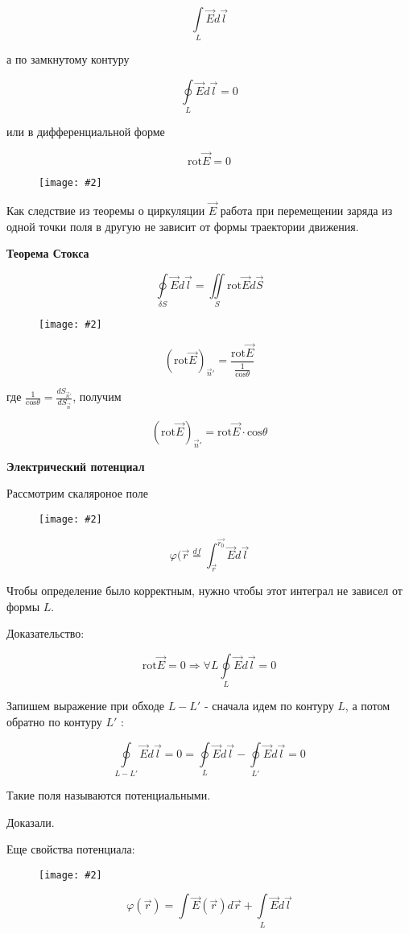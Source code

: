 \documentclass[a4paper,12pt]{article}
\newcommand{\tc}[1]{
    \vspace{0.5em}
    \noindent\textbf{\large #1}
    \vspace{0.3em}
}
\newcommand{\fc}[1]{\[#1\]}
\newcommand{\mdd}[1]{$#1$}
\newcommand{\mm}[1]{\mathrm{#1}}
\newcommand{\imc}[2][0.7\textwidth]{%
    \begin{figure}[h!]
        \centering
        \texttt{[image: \#2]}
    \end{figure}%
}
\begin{document}
\fc{\underset{L}{\int} \vec{E} d\vec{l}} 

а по замкнутому контуру

\fc{\underset{L}{\oint} \vec{E} d\vec{l}=0} 

или в дифференциальной форме 

\fc{\mm{rot}\vec{E}=0}

\imc[0.5\textwidth]{5.png} 

Как следствие из теоремы о циркуляции \mdd{\vec{E}} работа при перемещении
заряда из одной точки поля в другую не зависит от формы траектории движения.

\newpage


\tc{Теорема Стокса}

\fc{\underset{\delta
S}{\oint}\vec{E}d\vec{l}=\underset{S}{\iint}\mm{rot}\vec{E}d\vec{S}}

\imc[0.5\textwidth]{6.png}

\fc{(\mm{rot}\vec{E})_{\vec{n}'}=\frac{\mm{rot}\vec{E}}{\frac{1}{\mm{cos}\theta
}}}

где \mdd{\frac{1}{\mm{cos}\theta}=\frac{dS_{\vec{n}'}}{dS_{\vec{n}}}}, получим

\fc{(\mm{rot}\vec{E})_{\vec{n}'}=\mm{rot}\vec{E}\cdot\mm{cos}\theta} 


\tc{Электрический потенциал}

Рассмотрим скаляроное поле

\imc[0.5\textwidth]{7.png}

\fc{\varphi(\vec{r}\overset{df}{=}\int_{\vec{r}}^{\vec{r_0}}\vec{E}d\vec{l}}

Чтобы определение было корректным, нужно чтобы этот интеграл не зависел от
формы \mdd{L}.

Доказательство:

\fc{\mm{rot}\vec{E}=0 \Rightarrow \forall L
\underset{L}{\oint}\vec{E}d\vec{l}=0}

Запишем выражение при обходе \mdd{L-L'} - сначала идем по контуру \mdd{L}, а
потом обратно по контуру \mdd{L'} : 

\fc{\underset{L-L'}{\oint}\vec{E}d\vec{l}=0=\underset{L}{\oint}\vec{E}d\vec{l}
-\underset{L'}{\oint}\vec{E}d\vec{l}=0}

Такие поля называются потенциальными.

Доказали.

Еще свойства потенциала: 

\imc[0.35\textwidth]{8.png}
   
\fc{\varphi(\vec{r})=\int \vec{E}(\vec{r})d\vec{r} + \underset{L}{\int}
\vec{E}d\vec{l} }
\end{document}

